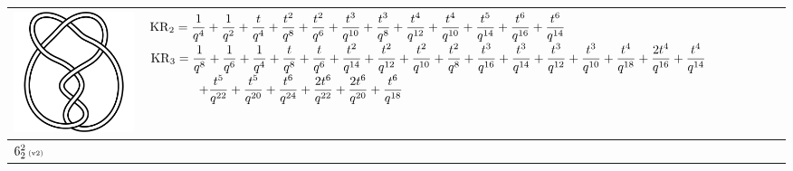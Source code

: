 \documentclass{compositio}
\theoremstyle{definition}
\numberwithin{equation}{section}
\begin{document}
{\begin{longtable}{p{}|p{}}
\includegraphics[scale=0.07,angle=0]{link6_2_2.pdf} 
& 
\newline 
$
\displaystyle{%
\KR_{2} = \frac{1}{q^4}+\frac{1}{q^2}+\frac{t}{q^4}+\frac{t^2}{q^8}+\frac{t^2}{q^6}+\frac{t^3}{q^{10}}+\frac{t^3}{q^8}+\frac{t^4}{q^{12}}+\frac{t^4}{q^{10}}+\frac{t^5}{q^{14}}+\frac{t^6}{q^{16}}+\frac{t^6}{q^{14}}
}
$
\newline 
$
\displaystyle{%
\KR_{3} = \frac{1}{q^8}+\frac{1}{q^6}+\frac{1}{q^4}+\frac{t}{q^8}+\frac{t}{q^6}+\frac{t^2}{q^{14}}+\frac{t^2}{q^{12}}+\frac{t^2}{q^{10}}+\frac{t^2}{q^8}+\frac{t^3}{q^{16}}+\frac{t^3}{q^{14}}+\frac{t^3}{q^{12}}+\frac{t^3}{q^{10}}+\frac{t^4}{q^{18}}+\frac{2 t^4}{q^{16}}+\frac{t^4}{q^{14}}
}
$
\newline
$
\displaystyle{%
\qquad\qquad +\frac{t^5}{q^{22}}+\frac{t^5}{q^{20}}+\frac{t^6}{q^{24}}+\frac{2 t^6}{q^{22}}+\frac{2 t^6}{q^{20}}+\frac{t^6}{q^{18}}
}
$
\newline 
\\
\hline
$6_{2}^2\,\text{{\tiny (v2)}}$ 

\end{longtable}}
\end{document}
